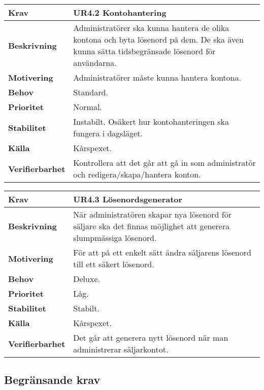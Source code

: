 \documentclass[a4paper, twoside, 11pt, titlepage]{article}
\begin{document}
		\begin{tabular} { p{2.6cm} p{12.5cm} }
			\hline
			\sffamily\textbf{Krav} & \sffamily\textbf{UR4.2 Kontohantering  } \\
			\hline
			\sffamily\textbf{Beskrivning} & Administratörer ska kunna hantera de olika kontona och byta lösenord på dem. De ska även kunna sätta tidsbegränsade lösenord för användarna.  \\
			\hline
			\sffamily\textbf{Motivering} & Administratörer måste kunna hantera kontona.  \\
			\hline
			\sffamily\textbf{Behov} & Standard.  \\
			\hline
			\sffamily\textbf{Prioritet} & Normal.  \\
			\hline
			\sffamily\textbf{Stabilitet} & Instabilt. Osäkert hur kontohanteringen ska fungera i dagsläget.  \\
			\hline
			\sffamily\textbf{Källa} & Kårspexet.  \\
			\hline
			\sffamily\textbf{Verifierbarhet} & Kontrollera att det går att gå in som administratör och redigera/skapa/hantera konton.  \\
			\hline
		\end{tabular}
		\vspace{6mm}

		\begin{tabular} { p{2.6cm} p{12.5cm} }
			\hline
			\sffamily\textbf{Krav} & \sffamily\textbf{UR4.3 Lösenordsgenerator  } \\
			\hline
			\sffamily\textbf{Beskrivning} & När administratören skapar nya lösenord för säljare ska det finnas möjlighet att generera slumpmässiga lösenord.  \\
			\hline
			\sffamily\textbf{Motivering} & För att på ett enkelt sätt ändra säljarens lösenord till ett säkert lösenord.  \\
			\hline
			\sffamily\textbf{Behov} & Deluxe.  \\
			\hline
			\sffamily\textbf{Prioritet} & Låg.  \\
			\hline
			\sffamily\textbf{Stabilitet} & Stabilt.  \\
			\hline
			\sffamily\textbf{Källa} & Kårspexet.  \\
			\hline
			\sffamily\textbf{Verifierbarhet} & Det går att generera nytt lösenord när man administrerar säljarkontot.  \\
			\hline
		\end{tabular}


	\subsection{Begränsande krav}
\end{document}
